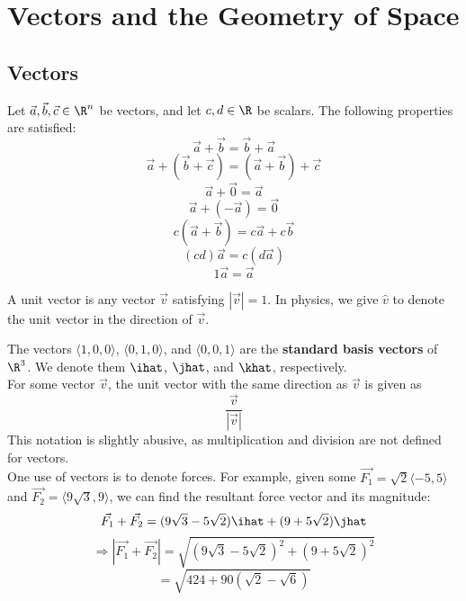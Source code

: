 \chapter{Vectors and the Geometry of Space}


\section{Vectors}
\begin{theorem}\label{thm:1}
	Let $\vec{a},\vec{b},\vec{c}\in\R^n$ be vectors, and let $c,d\in\R$ be scalars. The following properties are satisfied:
	$$\vec{a}+\vec{b}=\vec{b}+\vec{a}$$
	$$\vec{a}+(\vec{b}+\vec{c})=(\vec{a}+\vec{b})+\vec{c}$$
	$$\vec{a}+\vec{0}=\vec{a}$$
	$$\vec{a}+(-\vec{a})=\vec{0}$$
	$$c(\vec{a}+\vec{b})=c\vec{a}+c\vec{b}$$
	$$(cd)\vec{a}=c(d\vec{a})$$
	$$1\vec{a}=\vec{a}$$
\end{theorem}
\begin{definition}\label{def:1}
	A unit vector is any vector $\vec{v}$ satisfying $|\vec{v}|=1$. In physics, we give $\hat{v}$ to denote the unit vector in the direction of $\vec{v}$.
\end{definition}
The vectors $\langle1,0,0\rangle$, $\langle0,1,0\rangle$, and $\langle0,0,1\rangle$ are the \textbf{standard basis vectors} of $\R^3$. We denote them $\ihat$, $\jhat$, and $\khat$, respectively.\\
For some vector $\vec{v}$, the unit vector with the same direction as $\vec{v}$ is given as
$$\frac{\vec{v}}{|\vec{v}|}$$
This notation is slightly abusive, as multiplication and division are not defined for vectors.\\
One use of vectors is to denote forces. For example, given some $\vec{F_1}=\sqrt{2}\langle-5,5\rangle$ and $\vec{F_2}=\langle9\sqrt{3},9\rangle$, we can find the resultant force vector and its magnitude:
$$\vec{F_1}+\vec{F_2}=(9\sqrt{3}-5\sqrt{2})\ihat+(9+5\sqrt{2})\jhat$$
$$\Rightarrow|\vec{F_1}+\vec{F_2}|=\sqrt{(9\sqrt{3}-5\sqrt{2})^2+(9+5\sqrt{2})^2}$$
$$=\sqrt{424+90(\sqrt{2}-\sqrt{6})}$$
	
